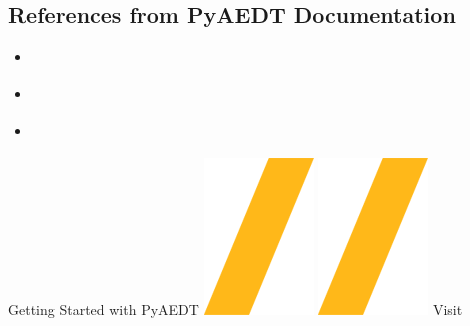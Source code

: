 \documentclass[9pt,landscape]{article}
\begin{document}
\begin{multicols}{3}
\subsection{References from PyAEDT Documentation}
\begin{itemize}
\item \href{https://aedtdocs.pyansys.com/Resources/Installation.html}{\color{blue}{Installation}}
\item \href{https://aedtdocs.pyansys.com/Resources/Code_Guidelines.html}{\color{blue}{Code guidelines}}
\item \href{https://aedtdocs.pyansys.com/API/index.html}{\color{blue}{API reference}}
\end{itemize}
\end{multicols}
\vspace{-0.15cm}
\noindent\makebox[\linewidth]{\rule{\paperwidth}{4pt}}
\begin{center}
Getting Started with PyAEDT \includegraphics[height=\fontcharht\font`\S]{slash.png} \href{https://github.com/pyansys/pyaedt}{\color{blue}{PyAEDT on GitHub}} \includegraphics[height=\fontcharht\font`\S]{slash.png} Visit 
\end{center}
\end{document}
